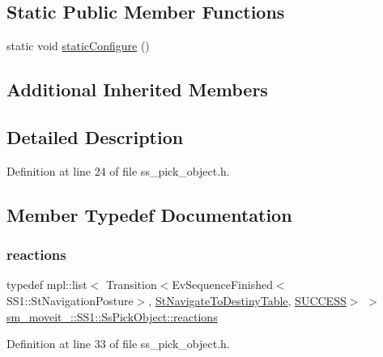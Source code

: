 \subsection*{Static Public Member Functions}
\begin{DoxyCompactItemize}
\item 
static void \hyperlink{structsm__moveit__4_1_1SS1_1_1SsPickObject_a14f0fa7ceafbbb3a1aca1475225ed5ce}{static\+Configure} ()
\end{DoxyCompactItemize}
\subsection*{Additional Inherited Members}


\subsection{Detailed Description}


Definition at line 24 of file ss\+\_\+pick\+\_\+object.\+h.



\subsection{Member Typedef Documentation}
\mbox{\label{structsm__moveit__4_1_1SS1_1_1SsPickObject_a91d86d49b71983c289daceda785cd5b2}} 
\subsubsection{\texorpdfstring{reactions}{reactions}}
{\footnotesize\ttfamily typedef mpl\+::list$<$ Transition$<$Ev\+Sequence\+Finished$<$S\+S1\+::\+St\+Navigation\+Posture$>$, \hyperlink{structsm__moveit__4_1_1StNavigateToDestinyTable}{St\+Navigate\+To\+Destiny\+Table}, \hyperlink{classSUCCESS}{S\+U\+C\+C\+E\+SS}$>$ $>$ \hyperlink{structsm__moveit__4_1_1SS1_1_1SsPickObject_a91d86d49b71983c289daceda785cd5b2}{sm\+\_\+moveit\+\_\+::\+S\+S1\+::\+Ss\+Pick\+Object\+::reactions}}



Definition at line 33 of file ss\+\_\+pick\+\_\+object.\+h.



